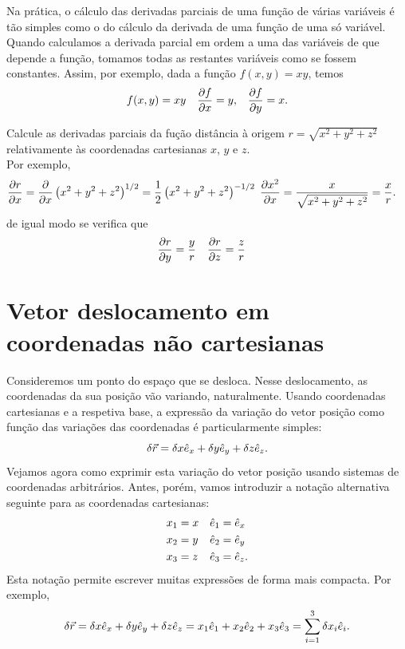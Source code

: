 Na prática, o cálculo das derivadas parciais de uma função de várias variáveis é
tão simples como o do cálculo da derivada de uma função de uma só variável.
Quando calculamos a derivada parcial em ordem a uma das variáveis de que depende
a função, tomamos todas as restantes variáveis como se fossem constantes. Assim,
por exemplo, dada a função $f(x,y)=xy$, temos
\begin{align*}
f(x,y)&=xy&\frac{\partial f}{\partial x}&=y,&\frac{\partial f}{\partial y}=x.
\end{align*}

\begin{examples}
\item Calcule as derivadas parciais da fução distância à origem
$r=\sqrt{x^2+y^2+z^2}$ relativamente às coordenadas cartesianas $x$, $y$ e $z$.
\\
Por exemplo, 
\begin{align*}
\frac{\partial r}{\partial x}&=\frac{\partial }{\partial x}\left(x^2+y^2+z^2\right)^{1/2}=
    \frac{1}{2}\left(x^2+y^2+z^2\right)^{-1/2}\;\frac{\partial x^2}{\partial x}
=\frac{x}{\sqrt{x^2+y^2+z^2}}=\frac{x}{r}.
\end{align*}
de igual modo se verifica que
\begin{align*}
\frac{\partial r}{\partial y}&=\frac{y}{r}& \frac{\partial r}{\partial z}&=\frac{z}{r}
\end{align*}
\end{examples}

\section{Vetor deslocamento em coordenadas não cartesianas}
Consideremos um ponto do espaço que se desloca.  Nesse deslocamento, as
coordenadas da sua posição vão variando, naturalmente. Usando coordenadas
cartesianas e a respetiva base, a expressão da variação do vetor posição como
função das variações das coordenadas é particularmente simples:
\begin{equation*}
  \delta \vec r= \delta x\he_x+\delta y\he_y+\delta z\he_z.
\end{equation*}
Vejamos agora como exprimir esta variação do vetor posição usando sistemas de
coordenadas arbitrários. Antes, porém, vamos introduzir a notação alternativa
seguinte para as coordenadas cartesianas:
\begin{align*}
  x_1&=x&\hat e_1&=\hat e_x\\
  x_2&=y&\hat e_2&=\hat e_y\\
  x_3&=z&\hat e_3&=\hat e_z.
\end{align*}
Esta notação permite escrever muitas expressões de forma mais compacta. Por
exemplo,
\begin{equation}\label{eq:drcart}
  \delta\vec r= \delta x\he_x+\delta y\he_y+\delta z\he_z
  =x_1\he_1+ x_2\he_2+ x_3\he_3=\sum_{i=1}^3\delta x_i\he_i.
\end{equation}

